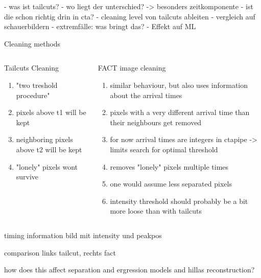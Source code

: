 \begin{frame}
    - was ist tailcuts?
    - wo liegt der unterschied? -> besonders zeitkomponente
    - ist die schon richtig drin in cta?
    - cleaning level von tailcuts ableiten
    - vergleich auf schauerbildern
    - extremfälle: was bringt das?
    - Effekt auf ML
\end{frame}

\begin{frame}{Cleaning methods}
    \begin{columns}[T] %
        \begin{column}{.48\textwidth}
            Tailcuts Cleaning
            \begin{enumerate}
                \item "two treshold procedure"
                \item pixels above t1 will be kept
                \item neighboring pixels above t2 will be kept
                \item "lonely" pixels wont survive
            \end{enumerate}
        \end{column}
        \begin{column}{.48\textwidth}
            FACT image cleaning
            \begin{enumerate}
                \item similar behaviour, but also uses information about the arrival times
                \item pixels with a very different arrival time than their neighbours get removed
                \item for now arrival times are integers in ctapipe -> limits search for optimal threshold
                \item removes "lonely" pixels multiple times
                \item one would assume less separated pixels
                \item intensity threshold should probably be a bit more loose than with tailcuts
        \end{enumerate}
        \end{column}
    \end{columns}
\end{frame}

\begin{frame}{timing information}
    bild mit intensity und peakpos
\end{frame}

\begin{frame}{comparison}
    links tailcut, rechts fact

    how does this affect separation and ergression models and hillas reconstruction?
\end{frame}

